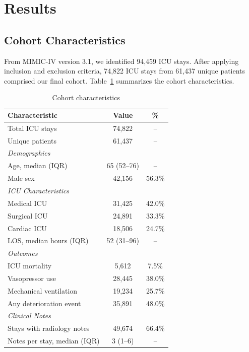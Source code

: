 \section{Results}

\subsection{Cohort Characteristics}

From MIMIC-IV version 3.1, we identified 94,459 ICU stays. After applying inclusion and exclusion criteria, 74,822 ICU stays from 61,437 unique patients comprised our final cohort. Table~\ref{tab:cohort} summarizes the cohort characteristics.

\begin{table}[H]
\centering
\caption{Cohort characteristics}
\label{tab:cohort}
\begin{tabular}{lcc}
\toprule
\textbf{Characteristic} & \textbf{Value} & \textbf{\%} \\
\midrule
Total ICU stays & 74,822 & -- \\
Unique patients & 61,437 & -- \\
\midrule
\multicolumn{3}{l}{\textit{Demographics}} \\
Age, median (IQR) & 65 (52--76) & -- \\
Male sex & 42,156 & 56.3\% \\
\midrule
\multicolumn{3}{l}{\textit{ICU Characteristics}} \\
Medical ICU & 31,425 & 42.0\% \\
Surgical ICU & 24,891 & 33.3\% \\
Cardiac ICU & 18,506 & 24.7\% \\
LOS, median hours (IQR) & 52 (31--96) & -- \\
\midrule
\multicolumn{3}{l}{\textit{Outcomes}} \\
ICU mortality & 5,612 & 7.5\% \\
Vasopressor use & 28,445 & 38.0\% \\
Mechanical ventilation & 19,234 & 25.7\% \\
Any deterioration event & 35,891 & 48.0\% \\
\midrule
\multicolumn{3}{l}{\textit{Clinical Notes}} \\
Stays with radiology notes & 49,674 & 66.4\% \\
Notes per stay, median (IQR) & 3 (1--6) & -- \\
\bottomrule
\end{tabular}
\end{table}

